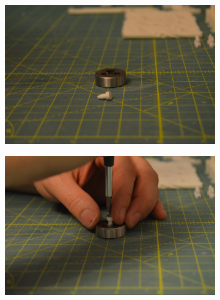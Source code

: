 \documentclass[openany]{book}
\begin{document}
\begin{figure}[!ht]
	\centering
	\begin{subfigure}{.4\textwidth}
		\centering
		\includegraphics[width=.95\textwidth]{images/image59.jpg}
		\label{fig:image59}	
	\end{subfigure}
	\begin{subfigure}{.4\textwidth}
		\centering
		\includegraphics[width=.95\textwidth]{images/image8.jpg}		
		\label{fig:image8}	
	\end{subfigure}

\bigskip


\end{figure}
\end{document}

